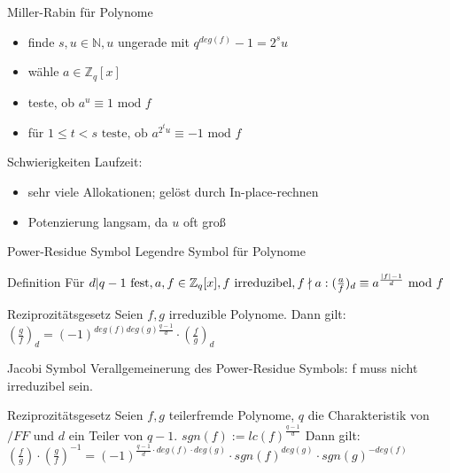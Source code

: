 \documentclass[german,10pt,xcolor=colortbl,compress]{beamer}%
\newcommand{\ZZ}{\mathbb{Z}}
\newcommand{\NN}{\mathbb{N}}
\begin{document}
	\begin{frame}{Miller-Rabin für Polynome}
		\begin{itemize}
			\item finde $s,u \in \NN,u $ ungerade mit $q^{deg(f)}-1=2^su $
			\item wähle $a \in \ZZ_q[x]$ 
			\item teste, ob $a^u \equiv 1 \text{ mod } f$
			\item für $1\leq t < s \text{ teste, ob } a^{2^t u} \equiv -1 \text{ mod } f$	
		\end{itemize}		
	\end{frame}


	\begin{frame}{Schwierigkeiten}
		Laufzeit: 
		
		\begin{itemize}
			\item sehr viele Allokationen; gelöst durch In-place-rechnen
			\item Potenzierung langsam, da $u$ oft groß
		\end{itemize}
	\end{frame}


	\begin{frame}{Power-Residue Symbol}
		Legendre Symbol für Polynome 
		\begin{block}{Definition}
			Für $d|q-1 \text{ fest},  a,f \in \ZZ_q[x], f \text{ irreduzibel}, f \nmid a: 
			\newline 	
			(\frac{a}{f})_d  \equiv a^{\frac{|f|-1}{d}} \text{ mod } f$
		\end{block}
	
		\begin{block}{Reziprozitätsgesetz}
			Seien $f,g$ irreduzible Polynome. Dann gilt:
			$(\frac{g}{f})_d=(-1)^{deg(f)deg(g)\frac{q-1}{d}} \cdot (\frac{f}{g})_d $ 				
		\end{block}
	\end{frame}

	
	\begin{frame}{Jacobi Symbol}
		Verallgemeinerung des Power-Residue Symbols: f muss nicht irreduzibel sein.
		
		\begin{block}{Reziprozitätsgesetz}
			Seien $f,g$ teilerfremde Polynome, $q$ die Charakteristik von $/FF$ und $d$ ein Teiler von $q-1$.
			$sgn(f):=lc(f)^{\frac{q-1}{d}}$ 
			Dann gilt:
			$\left(\frac{f}{g}\right) \cdot \left(\frac{g}{f}\right)^{-1} = (-1)^{\frac{q-1}{d} \cdot deg(f)\cdot deg(g)}\cdot sgn(f)^{deg(g)} \cdot sgn(g)^{-deg(f)} $
							
		\end{block}
	\end{frame}
\end{document}
